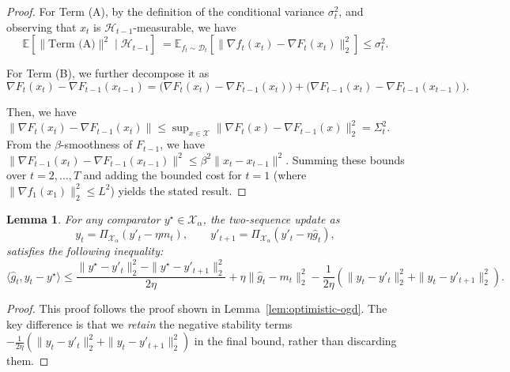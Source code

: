 \documentclass[journal,onecolumn]{IEEEtran}
\newcommand{\cD}{\mathcal{D}}
\newcommand{\cX}{\mathcal{X}}
\theoremstyle{plain}
\newtheorem{lemma}[theorem]{Lemma}
\theoremstyle{definition}
\theoremstyle{remark}
\begin{document}
{\begin{proof}
    For Term (A), by the definition of the conditional variance $\sigma_{t}^{2}$,
    and observing that $x_{t}$ is $\mathcal{H}_{t-1}$-measurable, we have
    \begin{equation*}
        \mathbb{E}\left[\|\text{Term (A)}\|^{2}\mid \mathcal{H}_{t-1}\right] \; =
        \mathbb{E}_{f_t\sim \cD_t}\left[\|\nabla f_{t}(x_{t})-\nabla F_{t}(x_{t})
        \|_{2}^{2}\right] \le \sigma_{t}^{2}.
    \end{equation*}

    For Term (B), we further decompose it as
    \begin{equation*}
        \nabla F_{t}(x_{t})-\nabla F_{t-1}(x_{t-1}) = \bigl(\nabla F_{t}(x_{t})-\nabla
        F_{t-1}(x_{t})\bigr)+ \bigl(\nabla F_{t-1}(x_{t})-\nabla F_{t-1}(x_{t-1})
        \bigr).
    \end{equation*}

    Then, we have
    $\|\nabla F_{t}(x_{t})-\nabla F_{t-1}(x_{t})\|\le \sup_{x\in \cX}\|\nabla F_{t}
    (x)-\nabla F_{t-1}(x)\|_{2}^{2}=\Sigma_{t}^{2}$. From the $\beta$-smoothness
    of $F_{t-1}$, we have
    $\|\nabla F_{t-1}(x_{t})-\nabla F_{t-1}(x_{t-1})\|^{2}\le \beta^{2}\|x_{t}-x_{t-1}
    \|^{2}$. Summing these bounds over $t=2,\dots,T$ and adding the bounded cost
    for $t=1$ (where $\|\nabla f_{1}(x_{1})\|_{2}^{2}\le L^{2}$) yields the stated
    result.
\end{proof}

\begin{lemma}
    \label{lem:tight-ogd} For any comparator $y^{\star} \in \cX_{\alpha}$, the
    two-sequence update as
    \begin{equation*}
        y_{t}= \Pi_{\cX_\alpha}(y'_{t}-\eta m_{t}), \qquad y'_{t+1}= \Pi_{\cX_\alpha}
        (y'_{t}-\eta \hat g_{t}),
    \end{equation*}
    satisfies the following inequality:
    \begin{equation*}
        \langle \hat g_{t}, y_{t} - y^{\star} \rangle \le \frac{\|y^{\star} - y'_{t}\|_{2}^{2}
        - \|y^{\star} - y'_{t+1}\|_{2}^{2}}{2\eta}+ \eta\|\hat g_{t} - m_{t}\|_{2}
        ^{2} -\frac{1}{2\eta}\left( \|y_{t} - y'_{t}\|_{2}^{2} + \|y_{t} - y'_{t+1}
        \|_{2}^{2} \right).
    \end{equation*}
\end{lemma}

\begin{proof}
    This proof follows the proof shown in Lemma~\ref{lem:optimistic-ogd}. The
    key difference is that we \emph{retain} the negative stability terms $-\frac{1}{2\eta}
    (\|y_{t}-y'_{t}\|_{2}^{2}+\|y_{t}-y'_{t+1}\|_{2}^{2})$ in the final bound,
    rather than discarding them.
\end{proof}

}
\end{document}
